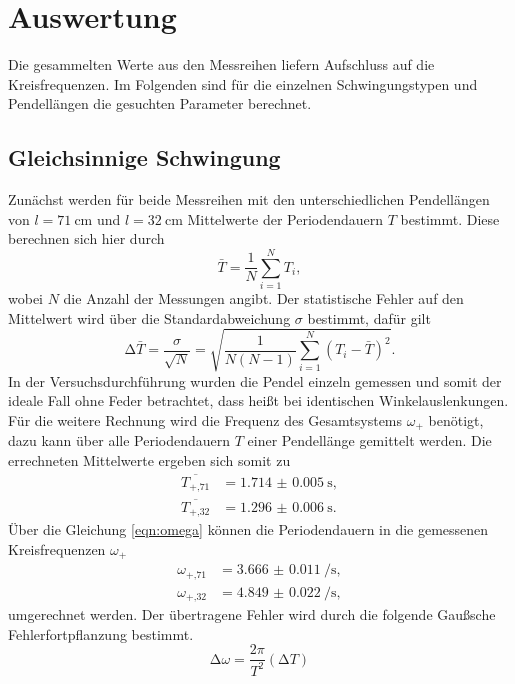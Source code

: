 \section{Auswertung}

Die gesammelten Werte aus den Messreihen liefern Aufschluss auf die Kreisfrequenzen. Im Folgenden sind für die einzelnen Schwingungstypen und Pendellängen die gesuchten Parameter berechnet.

\subsection{Gleichsinnige Schwingung}
Zunächst werden für beide Messreihen mit den unterschiedlichen Pendellängen von $l = \SI{71}{\centi\meter}$ und $l = \SI{32}{\centi\meter}$ Mittelwerte der Periodendauern $T$ bestimmt.
Diese berechnen sich hier durch 
\begin{equation}
    \label{eqn:mean}
\bar{T} = \frac{1}{N} \sum_{i=1}^{N} T_{i},
\end{equation}
wobei $N$ die Anzahl der Messungen angibt. Der statistische Fehler auf den Mittelwert wird über die Standardabweichung $\sigma$ bestimmt, dafür gilt
\begin{equation}
    \label{eqn:sem}
\increment \bar{T} = \frac{\sigma}{\sqrt{N}} = \sqrt{\frac{1}{N(N-1)} \sum_{i=1}^{N} (T_{i} - \bar{T})^{2}}.
\end{equation}
In der Versuchsdurchführung wurden die Pendel einzeln gemessen und somit der ideale Fall ohne Feder betrachtet, dass heißt bei identischen Winkelauslenkungen.
Für die weitere Rechnung wird die Frequenz des Gesamtsystems $\omega_{+}$ benötigt, dazu kann über alle Periodendauern $T$ einer Pendellänge gemittelt werden.
Die errechneten Mittelwerte ergeben sich somit zu
\begin{align*}
    \overline{T_{+\text{,}71}} &= \SI{1.714(5)}{\second}, \\
    \overline{T_{+\text{,}32}} &= \SI{1.296(6)}{\second}. 
\end{align*}
Über die Gleichung \eqref{eqn:omega} können die Periodendauern in die gemessenen Kreisfrequenzen $\omega_{+}$ 
\begin{align*}
    \omega_{+\text{,}71} &= \SI{3.666(11)}{\per\second}, \\
    \omega_{+\text{,}32} &= \SI{4.849(22)}{\per\second}, 
\end{align*}
umgerechnet werden. Der übertragene Fehler wird durch die folgende Gaußsche Fehlerfortpflanzung bestimmt.
\begin{equation}
    \label{eqn:gauss}
\increment \omega = \frac{2 \pi}{T^2} (\increment T)
\end{equation}

